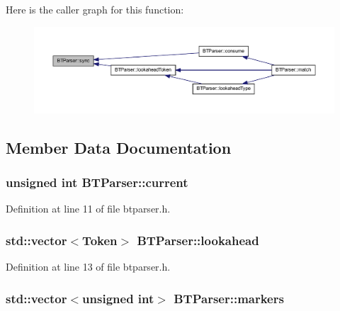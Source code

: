 Here is the caller graph for this function:\nopagebreak
\begin{figure}[H]
\begin{center}
\leavevmode
\includegraphics[width=400pt]{class_b_t_parser_a762e16322aec6e50af51c2b6377d86fe_icgraph}
\end{center}
\end{figure}




\subsection{Member Data Documentation}
\hypertarget{class_b_t_parser_a29930e6537cb65bbefe1962763372165}{
\subsubsection[{current}]{\setlength{\rightskip}{0pt plus 5cm}unsigned int {\bf BTParser::current}}}
\label{class_b_t_parser_a29930e6537cb65bbefe1962763372165}


Definition at line 11 of file btparser.h.

\hypertarget{class_b_t_parser_a796693745ebe354914eeacddba20f109}{
\subsubsection[{lookahead}]{\setlength{\rightskip}{0pt plus 5cm}std::vector$<${\bf Token}$>$ {\bf BTParser::lookahead}}}
\label{class_b_t_parser_a796693745ebe354914eeacddba20f109}


Definition at line 13 of file btparser.h.

\hypertarget{class_b_t_parser_aae8dc94330bb217be99ab2a8f6af005d}{
\subsubsection[{markers}]{\setlength{\rightskip}{0pt plus 5cm}std::vector$<$unsigned int$>$ {\bf BTParser::markers}}}
\label{class_b_t_parser_aae8dc94330bb217be99ab2a8f6af005d}


